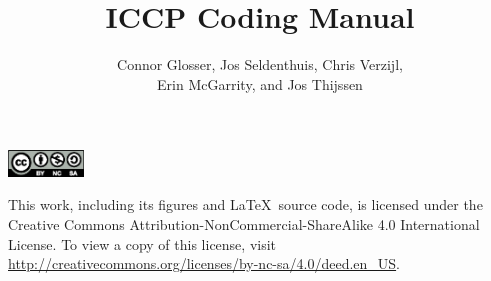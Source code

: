 \documentclass[openany,oneside]{book}
\begin{document}
\title{ICCP Coding Manual}
\author{Connor Glosser, Jos Seldenthuis, Chris Verzijl, \\ 
  Erin McGarrity, and Jos Thijssen}

\frontmatter
\maketitle

\newpage
\null
\vfill
\begin{center}
  \includegraphics[width=0.15\textwidth]{figures/by-nc-sa.eps}
\end{center}
This work, including its figures and \LaTeX\ source code, is licensed under the Creative Commons Attribution-NonCommercial-ShareAlike 4.0 International License. 
To view a copy of this license, visit \url{http://creativecommons.org/licenses/by-nc-sa/4.0/deed.en_US}.

\tableofcontents
\end{document}
